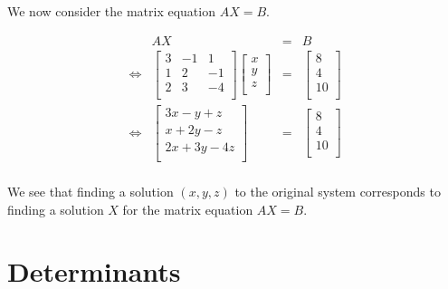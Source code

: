 We now consider the matrix equation $AX = B$.

\[ \begin{array}{rrcl}

 & AX & = & B \\ [13pt]
\Leftrightarrow & \left[ \begin{array}{rrr} 3 & -1 & 1  \\ 1 & 2 & -1  \\ 2 & 3 & -4  \\ \end{array} \right] \left[ \begin{array}{r}  x \\  y \\  z \\ \end{array} \right] & = & \left[ \begin{array}{r}  8 \\  4 \\  10 \\ \end{array} \right] \\ [13pt]
\Leftrightarrow & \left[ \begin{array}{rrr} 3x -y +z  \\ x + 2y  -z  \\ 2x + 3y  -4 z \\ \end{array} \right] & = & \left[ \begin{array}{r}  8 \\  4 \\  10 \\ \end{array} \right] \\ [13pt]
\end{array}\]

We see that finding a solution $(x,y,z)$ to the original system corresponds to finding a solution $X$ for the matrix equation $AX = B$.  





\section{Determinants}

